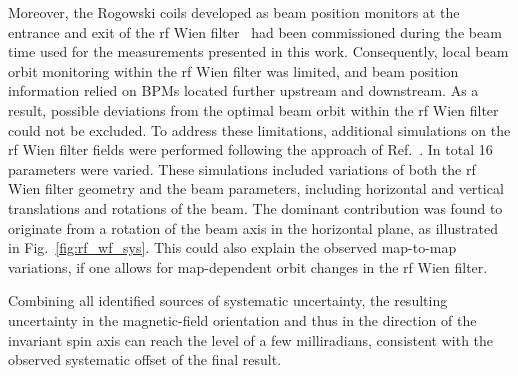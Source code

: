 \documentclass[
    10pt,
    twocolumn,
    secnumarabic,
    amssymb,
    nobibnotes,
    aps,
    prl,

    longbibliography,
    superscriptaddress
    ]{revtex4-2}
\begin{document}
Moreover, the Rogowski coils developed as beam position monitors at the entrance and exit of the rf Wien filter~\cite{rogowski_bpm} had been commissioned during the beam time used for the measurements presented in this work. Consequently, local beam orbit monitoring within the rf Wien filter was limited, and beam position information relied on BPMs located further upstream and downstream.
As a result, possible deviations from the optimal beam orbit within the rf Wien filter could not be excluded.
To address these limitations, additional simulations on the rf Wien filter fields were performed following the approach of Ref.~\cite{Slim:2016dct}.
In total 16 parameters were varied.
These simulations included variations of both the rf Wien filter geometry and the beam parameters, including horizontal and vertical translations and rotations of the beam. The dominant contribution was found to originate from a rotation of the beam axis in the horizontal plane, as illustrated in Fig.~\ref{fig:rf_wf_sys}.
This could also explain the observed map-to-map variations, if one allows for map-dependent orbit changes in the rf Wien filter.

Combining all identified sources of systematic uncertainty, the resulting uncertainty in the magnetic-field orientation and thus in the direction of the invariant spin axis can reach the level of a few milliradians, consistent with the observed systematic offset of the final result.
\end{document}
